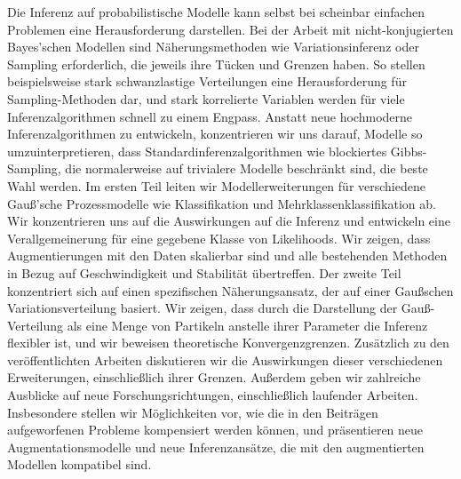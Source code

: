 
\begin{zusammenfassung}        %
Die Inferenz auf probabilistische Modelle kann selbst bei scheinbar einfachen Problemen eine Herausforderung darstellen.
Bei der Arbeit mit nicht-konjugierten Bayes'schen Modellen sind Näherungsmethoden wie Variationsinferenz oder Sampling erforderlich, die jeweils ihre Tücken und Grenzen haben.
So stellen beispielsweise stark schwanzlastige Verteilungen eine Herausforderung für Sampling-Methoden dar, und stark korrelierte Variablen werden für viele Inferenzalgorithmen schnell zu einem Engpass.
Anstatt neue hochmoderne Inferenzalgorithmen zu entwickeln, konzentrieren wir uns darauf, Modelle so umzuinterpretieren, dass Standardinferenzalgorithmen wie blockiertes Gibbs-Sampling, die normalerweise auf trivialere Modelle beschränkt sind, die beste Wahl werden.
Im ersten Teil leiten wir Modellerweiterungen für verschiedene Gauß'sche Prozessmodelle wie Klassifikation und Mehrklassenklassifikation ab.
Wir konzentrieren uns auf die Auswirkungen auf die Inferenz und entwickeln eine Verallgemeinerung für eine gegebene Klasse von Likelihoods.
Wir zeigen, dass Augmentierungen mit den Daten skalierbar sind und alle bestehenden Methoden in Bezug auf Geschwindigkeit und Stabilität übertreffen.
Der zweite Teil konzentriert sich auf einen spezifischen Näherungsansatz, der auf einer Gaußschen Variationsverteilung basiert.
Wir zeigen, dass durch die Darstellung der Gauß-Verteilung als eine Menge von Partikeln anstelle ihrer Parameter die Inferenz flexibler ist, und wir beweisen theoretische Konvergenzgrenzen.
Zusätzlich zu den veröffentlichten Arbeiten diskutieren wir die Auswirkungen dieser verschiedenen Erweiterungen, einschließlich ihrer Grenzen.
Außerdem geben wir zahlreiche Ausblicke auf neue Forschungsrichtungen, einschließlich laufender Arbeiten.
Insbesondere stellen wir Möglichkeiten vor, wie die in den Beiträgen aufgeworfenen Probleme kompensiert werden können, und präsentieren neue Augmentationsmodelle und neue Inferenzansätze, die mit den augmentierten Modellen kompatibel sind.
\end{zusammenfassung}
\ifCLASSINFOlangDE
{}
\else
{}
\fi

